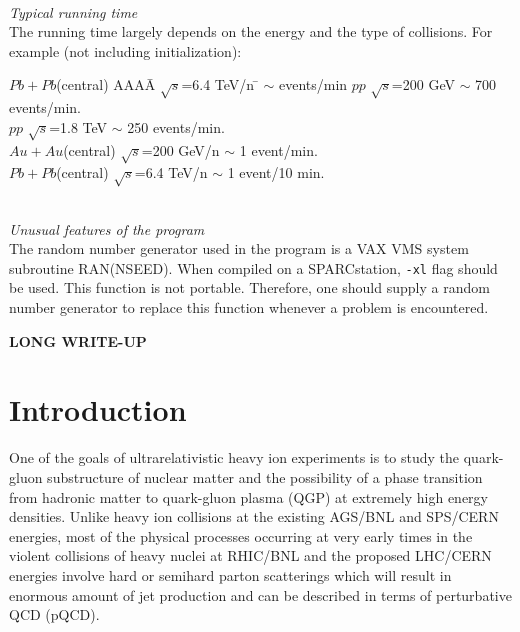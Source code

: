 \vspace{0pt}\\
{\em Typical running time}\\
The running time largely depends on the energy and the type of
collisions. For example (not including initialization):\\
\begin{tabbing}
$Pb+Pb$(central) AAAA\= $\sqrt{s}$=6.4 TeV/n \= $\sim$ events/min \kill
$pp$ \> $\sqrt{s}$=200 GeV \> $\sim$ 700 events/min.\\
$pp$ \> $\sqrt{s}$=1.8 TeV \> $\sim$ 250 events/min.\\
$Au+Au$(central) \> $\sqrt{s}$=200 GeV/n \> $\sim$ 1 event/min.\\
$Pb+Pb$(central) \> $\sqrt{s}$=6.4 TeV/n \> $\sim$ 1 event/10 min.
\end{tabbing}
\mbox{}\\
{\em Unusual features of the program}\\
        The random number generator used in the program is a 
VAX VMS system subroutine RAN(NSEED). When compiled on a
SPARCstation, {\tt -xl} flag should be used. This function
is not portable. Therefore, one should supply a random
number generator to replace this function whenever a problem
is encountered.

\newpage

\begin{center}
{\Large\bf LONG WRITE-UP}
\end{center}

\section{Introduction}

        One of the goals of ultrarelativistic heavy ion experiments is
to study the quark-gluon substructure of nuclear matter and the
possibility of a phase transition from hadronic matter to quark-gluon
plasma (QGP)\cite{review} at extremely high energy densities. 
Unlike heavy ion collisions
at the existing AGS/BNL and SPS/CERN energies, most of the physical
processes occurring at very early times in the violent collisions of 
heavy nuclei at RHIC/BNL and the proposed LHC/CERN energies involve
hard or semihard parton scatterings\cite{kaja} 
which will result in enormous amount of jet production and 
can be described in terms of perturbative QCD (pQCD).

